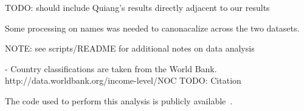 TODO: should include Quiang's results directly adjacent to our results

Some processing on names was needed to canonacalize across the two datasets.

NOTE: see scripts/README for additional notes on data analysis

- Country classifications are taken from the World
Bank. http://data.worldbank.org/income-level/NOC
TODO: Citation


The code used to perform this analysis is publicly available~\cite{github}.
